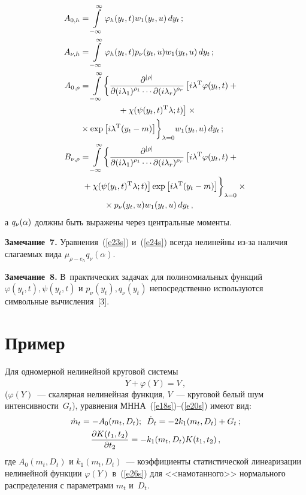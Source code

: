 \begin{multicols}{2}
\noindent
\begin{align*}
A_{0,h} &=\iin \varphi_h (y_t, t) w_1(y_t,u) \,d y_t\,;\\
A_{\nu,h} &=\iin \varphi_h (y_t, t)p_\nu (y_t,u) w_1(y_t,u)\, d y_t\,;\\
A_{0,\rho} &=\iin \biggl\{ \fr{\prt^{|\rho |}}{\prt (i\la_1)^{\rho_1} \cdots 
\prt ( i\lambda_r)^{\rho_r}} \left[ i\lambda^{\mathrm{T}} \varphi(y_t, t)+{}\right.\\
&\hspace*{15mm}\left.{}+
\chi(\psi (y_t, t)^{\mathrm{T}}\lambda;t)\right] \times{}\\
&{}\times \exp \lk i\lambda^{\mathrm{T}} (y_t-m)\rk \biggr\}_{\lambda=0}  w_1(y_t,u)\, d y_t\,;\\
B_{\nu,\rho} &=\iin \biggl\{ \fr{\prt^{|\rho |}}
{\prt (i\lambda_1)^{\rho_1} \cdots \prt ( i\lambda_r)^{\rho_r}} \left[ i\lambda^{\mathrm{T}} 
\varphi(y_t, t)+{}\right.\\
&\left.{}+\chi(\psi (y_t, t)^{\mathrm{T}}\lambda;t)\right ] 
\exp \lk i\lambda^{\mathrm{T}} (y_t-m)\rk \biggr\}_{\lambda=0}\times{}\\
&\hspace*{10mm}{}\times p_\nu (y_t,u)  
w_1(y_t,u)\, d y_t\,, %
\end{align*}
а  $q_\nu (\alpha)$ должны быть выражены через центральные моменты.

\medskip

\noindent
\textbf{Замечание~7.} Уравнения~(\ref{e23s}) и~(\ref{e24s}) 
всегда нелинейны из-за наличия слагаемых вида $\mu_{\rho-e_h} q_\nu (\alpha)$.

\medskip

\noindent
\textbf{Замечание~8.} В~практических задачах для 
полиномиальных функций  $\varphi (y_t, t) , \psi(y_t, t)$ и  $p_\nu (y_t), q_\nu(y_t)$ 
непосредственно используются символьные вы\-чис\-ле\-ния~[3].


\section{Пример}

Для одномерной нелинейной круговой сис\-те\-мы
\begin{equation}
\dot Y +\varphi (Y)=V\,,\label{e26s}
\end{equation}
($\varphi (Y)$~--- скалярная нелинейная функция, $V$~--- круговой белый шум интенсивности~$G_t$), 
уравнения МННА~(\ref{e18s})--(\ref{e20s}) имеют вид:
\begin{gather*}
\dot m_t = - A_0 (m_t, D_t);\enskip \dot D_t =- 2 k_1 (m_t, D_t) + G_t\,;\\
\displaystyle\frac{\displaystyle \partial K(t_1, t_2)\mathstrut}{\displaystyle  \partial t_2\mathstrut} =- k_1 (m_t, D_t) K(t_1, t_2)\,,
\end{gather*}
где $A_0 (m_t, D_t)$ и $k_1 (m_t, D_t)$~--- 
коэффициенты статистической линеаризации нелинейной функции  $\varphi(Y)$ в~(\ref{e26s}) 
для <<намотанного>> нормального распределения с параметрами  $m_t$ и~$D_t$.


\end{multicols}
